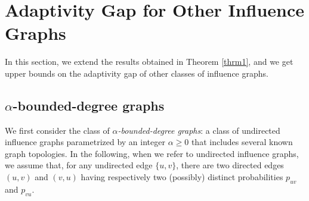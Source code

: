 \section{Adaptivity Gap for Other Influence Graphs}\label{sec_other}
In this section, we extend the results obtained in Theorem \ref{thrm1}, and we get upper bounds on the adaptivity gap of other classes of influence graphs. 
\subsection {$\alpha$-bounded-degree graphs} \label{sec_alpha}
We first consider the class of {\em $\alpha$-bounded-degree graphs}: a class of undirected influence graphs parametrized by an integer $\alpha\geq 0$ that includes several known graph topologies. In the following, when we refer to undirected influence graphs, we assume that, for any undirected edge $\{u,v\}$, there are two directed edges $(u,v)$ and $(v,u)$ having respectively two (possibly) distinct probabilities $p_{uv}$ and $p_{vu}$. 

